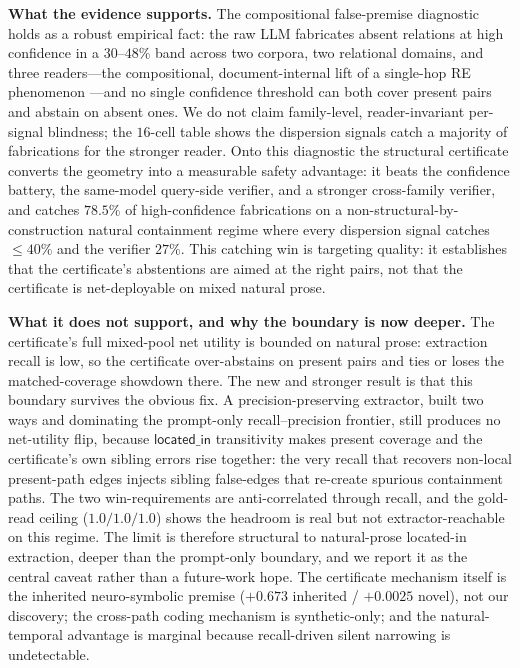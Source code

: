 \documentclass[11pt,letterpaper]{article}
\begin{document}
\textbf{What the evidence supports.} The compositional false-premise diagnostic holds as a robust empirical fact: the raw LLM fabricates absent relations at high confidence in a $30$--$48\%$ band across two corpora, two relational domains, and three readers---the compositional, document-internal lift of a single-hop RE phenomenon \citep{Yang2025DEPTH}---and no single confidence threshold can both cover present pairs and abstain on absent ones. We do not claim family-level, reader-invariant per-signal blindness; the $16$-cell table shows the dispersion signals catch a majority of fabrications for the stronger reader. Onto this diagnostic the structural certificate converts the geometry into a measurable safety advantage: it beats the confidence battery, the same-model query-side verifier, and a stronger cross-family verifier, and catches $78.5\%$ of high-confidence fabrications on a non-structural-by-construction natural containment regime where every dispersion signal catches $\leq 40\%$ and the verifier $27\%$. This catching win is targeting quality: it establishes that the certificate's abstentions are aimed at the right pairs, not that the certificate is net-deployable on mixed natural prose.

\textbf{What it does not support, and why the boundary is now deeper.} The certificate's full mixed-pool net utility is bounded on natural prose: extraction recall is low, so the certificate over-abstains on present pairs and ties or loses the matched-coverage showdown there. The new and stronger result is that this boundary survives the obvious fix. A precision-preserving extractor, built two ways and dominating the prompt-only recall--precision frontier, still produces no net-utility flip, because $\textsf{located\_in}$ transitivity makes present coverage and the certificate's own sibling errors rise together: the very recall that recovers non-local present-path edges injects sibling false-edges that re-create spurious containment paths. The two win-requirements are anti-correlated through recall, and the gold-read ceiling ($1.0/1.0/1.0$) shows the headroom is real but not extractor-reachable on this regime. The limit is therefore structural to natural-prose located-in extraction, deeper than the prompt-only boundary, and we report it as the central caveat rather than a future-work hope. The certificate mechanism itself is the inherited neuro-symbolic premise ($+0.673$ inherited / $+0.0025$ novel), not our discovery; the cross-path coding mechanism is synthetic-only; and the natural-temporal advantage is marginal because recall-driven silent narrowing is undetectable.
\end{document}
